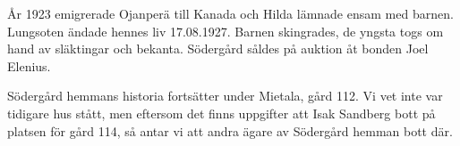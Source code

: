 År 1923 emigrerade Ojanperä till Kanada och Hilda lämnade ensam med barnen. Lungsoten ändade hennes liv 17.08.1927. Barnen skingrades, de yngsta togs om hand av släktingar och bekanta. Södergård såldes på auktion åt bonden Joel Elenius.

Södergård hemmans historia fortsätter under Mietala, gård 112. Vi vet inte var tidigare hus stått, men eftersom det finns uppgifter att Isak Sandberg bott på platsen för gård 114, så antar vi att andra ägare av Södergård hemman bott där.
